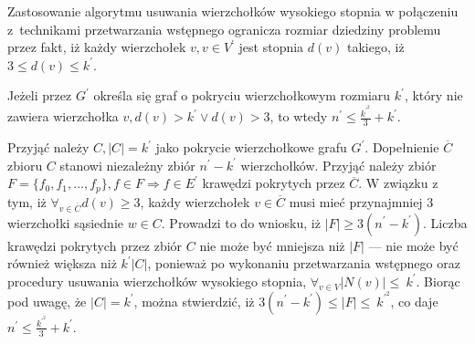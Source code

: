 Zastosowanie algorytmu usuwania wierzchołków wysokiego stopnia w połączeniu 
z~technikami przetwarzania wstępnego ogranicza rozmiar dziedziny problemu przez
fakt, iż każdy wierzchołek $v, v \in V^\prime$ jest stopnia $d(v)$ takiego, iż
$3 \leq d(v) \leq k^\prime$.

\begin{theorem}
  Jeżeli przez $G^\prime$ określa się graf o pokryciu wierzchołkowym rozmiaru
  $k^\prime$, który nie zawiera wierzchołka $v, d(v) > k^\prime \lor d(v) > 3$, to
  wtedy $n^\prime \leq \frac{k^\prime^2}{3} + k^\prime$.
\end{theorem}
\begin{bproof}
  Przyjąć należy ${C,|C|=k^\prime}$ jako pokrycie wierzchołkowe grafu
  $G^\prime$.
  Dopełnienie $\overline{C}$ zbioru $C$ stanowi niezależny zbiór
  $n^\prime-k^\prime$ wierzchołków.
  Przyjąć należy zbiór $F=\{f_0,f_1, \ldots, f_p\}, f \in F \Rightarrow f \in E^\prime$
  krawędzi pokrytych przez $\overline{C}$.
  W związku z tym, iż $\forall_{v \in \overline{C}}{d(v) \geq 3}$, każdy
  wierzchołek $v \in \overline{C}$ musi mieć przynajmniej 3 wierzchołki sąsiednie
  $w \in C$.
  Prowadzi to do wniosku, iż $|F| \geq 3(n^\prime - k^\prime)$.
  Liczba krawędzi pokrytych przez zbiór $C$ nie może być mniejsza niż $|F|$ --- nie
  może być również większa niż $k^\prime|C|$, ponieważ po wykonaniu
  przetwarzania wstępnego oraz procedury usuwania wierzchołków wysokiego stopnia,
  $\forall_{v \in V}{|N(v)|\leq~k^\prime}$.
  Biorąc pod uwagę, że $|C|=k^\prime$, można stwierdzić, iż
  ${3(n^\prime-k^\prime)\leq|F|\leq~k^\prime^2}$, co daje ${n^\prime\leq\frac{k^\prime^2}{3}+k^\prime}$.
\end{bproof}



